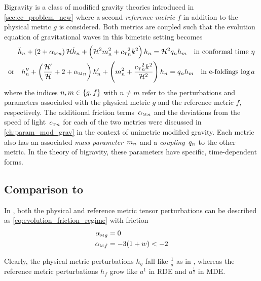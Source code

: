 \documentclass[parskip=half]{scrreprt}
\begin{document}
Bigravity is a class of modified gravity theories introduced in \autoref{sec:cc_problem_new} where a second \emph{reference metric} \(f\) in addition to the physical metric \(g\) is considered. Both metrics are coupled such that the evolution equation of gravitational waves in this bimetric setting becomes \citep{Amendola2015}
\begin{subequations}\label{eq:evolution_bimetric}
\begin{align}
	\ddconf{h}\ofmetr{n} + \del{2 + \alphaMofmetr{n}} \Hconf \dconf{h}\ofmetr{n} + \del{\Hconf^2 \mofmetr{n}^2 + \cTofmetr{n}^2 k^2} h\ofmetr{n} = \Hconf^2 \qofmetr{n} h\ofmetr{m} \quad \text{in conformal time \(\conft\)} \\
    \text{or} \quad \ddefold{h}\ofmetr{n} + \del{\frac{\defold{\Hconf}}{\Hconf} + 2 + \alphaMofmetr{n}} \defold{h}\ofmetr{n} + \del{\mofmetr{n}^2 + \frac{\cTofmetr{n}^2 k^2}{\Hconf^2}} h\ofmetr{n} = \qofmetr{n} h\ofmetr{m} \quad \text{in e-foldings \(\efold\)}
\end{align}
\end{subequations}
where the indices \(n,m \in \cbr{g,f}\) with \(n \neq m\) refer to the perturbations and parameters associated with the physical metric \(g\) and the reference metric \(f\), respectively. The additional friction terms~\({\alpha_{\textnormal{\tiny{M}}}}_{n}\) and the deviations from the speed of light~\({c_{\textnormal{\tiny{T}}}}_{n}\) for each of the two metrics were discussed in \autoref{ch:param_mod_grav} in the context of unimetric modified gravity. Each metric also has an associated \emph{mass parameter}~\(m_{n}\) and a \emph{coupling}~\(q_{n}\) to the other metric. In the theory of bigravity, these parameters have specific, time-dependent forms.



\subsection{Comparison to \cite{Amendola2015}}

In \cite{Amendola2015}, both the physical and reference metric tensor perturbations can be described as \ref{eq:evolution_friction_regime} with friction
\begin{align}
	{\alpha_{\textnormal{\tiny{M}}}}_{g} &= 0 \\
	{\alpha_{\textnormal{\tiny{M}}}}_{f} &= -3(1+w) < -2
\end{align}

Clearly, the physical metric perturbations $h_g$ fall like $\frac{1}{a}$ as in \LCDM, whereas the reference metric perturbations $h_f$ grow like $a^1$ in RDE and $a^\frac{1}{2}$ in MDE.
\end{document}
